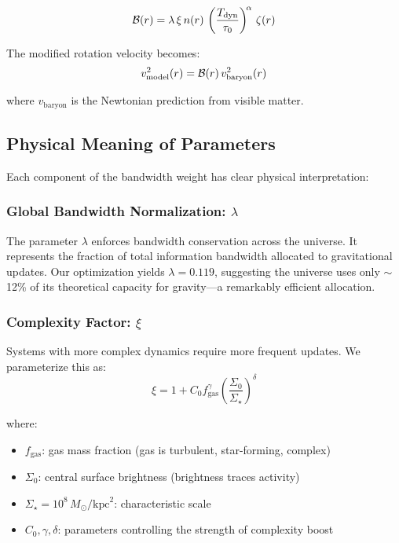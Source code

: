 \documentclass[twocolumn,prd,amsmath,amssymb,aps,superscriptaddress,nofootinbib]{revtex4-2}
\newcommand{\Msun}{M_{\odot}}
\newcommand{\kpc}{\text{kpc}}
\begin{document}
\begin{equation}
\mathcal{B}(r) = \lambda \, \xi \, n(r) \, \left(\frac{T_{\rm dyn}}{\tau_0}\right)^{\!\alpha} \, \zeta(r)
\label{eq:bandwidth_weight}
\end{equation}

The modified rotation velocity becomes:
\begin{equation}
v_{\rm model}^2(r) = \mathcal{B}(r)\, v_{\rm baryon}^2(r)
\label{eq:v_model}
\end{equation}

where $v_{\text{baryon}}$ is the Newtonian prediction from visible matter.

\subsection{Physical Meaning of Parameters}

Each component of the bandwidth weight has clear physical interpretation:

\subsubsection{Global Bandwidth Normalization: $\lambda$}

The parameter $\lambda$ enforces bandwidth conservation across the universe. It represents the fraction of total information bandwidth allocated to gravitational updates. Our optimization yields $\lambda = 0.119$, suggesting the universe uses only $\sim$12\% of its theoretical capacity for gravity---a remarkably efficient allocation.

\subsubsection{Complexity Factor: $\xi$}

Systems with more complex dynamics require more frequent updates. We parameterize this as:
\begin{equation}
\xi = 1 + C_0 f_{\text{gas}}^\gamma \left(\frac{\Sigma_0}{\Sigma_\star}\right)^\delta
\label{eq:complexity}
\end{equation}

where:
\begin{itemize}
\item $f_{\text{gas}}$: gas mass fraction (gas is turbulent, star-forming, complex)
\item $\Sigma_0$: central surface brightness (brightness traces activity)
\item $\Sigma_\star = 10^8\,\Msun/\kpc^2$: characteristic scale
\item $C_0, \gamma, \delta$: parameters controlling the strength of complexity boost
\end{itemize}
\end{document}
